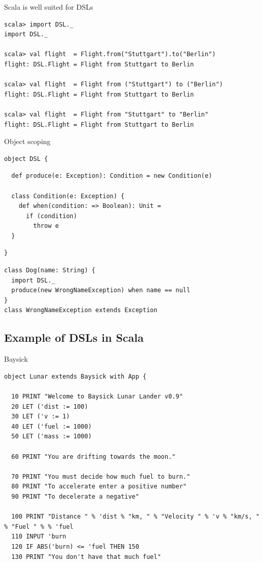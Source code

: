 \begin{frame}[fragile]{Scala is well suited for DSLs}
\begin{lstlisting}
scala> import DSL._
import DSL._

scala> val flight  = Flight.from("Stuttgart").to("Berlin")
flight: DSL.Flight = Flight from Stuttgart to Berlin

scala> val flight  = Flight from ("Stuttgart") to ("Berlin")
flight: DSL.Flight = Flight from Stuttgart to Berlin

scala> val flight  = Flight from "Stuttgart" to "Berlin"
flight: DSL.Flight = Flight from Stuttgart to Berlin
\end{lstlisting}
\end{frame}

\begin{frame}[fragile]{Object scoping}
\begin{lstlisting}
object DSL {
\end{lstlisting}
\begin{lstlisting}
  def produce(e: Exception): Condition = new Condition(e)

  class Condition(e: Exception) {
    def when(condition: => Boolean): Unit =
      if (condition)
        throw e
  }
\end{lstlisting}
\begin{lstlisting}
}
\end{lstlisting}
\begin{lstlisting}
class Dog(name: String) {
  import DSL._
  produce(new WrongNameException) when name == null
}
class WrongNameException extends Exception
\end{lstlisting}
\end{frame}

\subsection{Example of DSLs in Scala}
\begin{frame}[fragile]{Baysick}
\begin{lstlisting}
object Lunar extends Baysick with App {

  10 PRINT "Welcome to Baysick Lunar Lander v0.9"
  20 LET ('dist := 100)
  30 LET ('v := 1)
  40 LET ('fuel := 1000)
  50 LET ('mass := 1000)

  60 PRINT "You are drifting towards the moon."

  70 PRINT "You must decide how much fuel to burn."
  80 PRINT "To accelerate enter a positive number"
  90 PRINT "To decelerate a negative"

  100 PRINT "Distance " % 'dist % "km, " % "Velocity " % 'v % "km/s, " % "Fuel " % % 'fuel
  110 INPUT 'burn
  120 IF ABS('burn) <= 'fuel THEN 150
  130 PRINT "You don't have that much fuel"
\end{lstlisting}
\end{frame}

